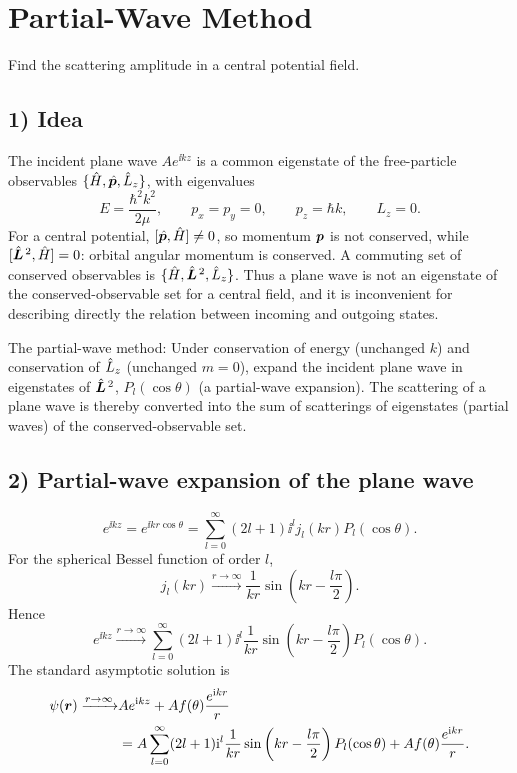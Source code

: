 \section{Partial-Wave Method}
Find the scattering amplitude in a central potential field.

\subsection*{1) Idea}
The incident plane wave $Ae^{\ii kz}$ is a common eigenstate of the free-particle observables $\{\hat{H},\hat{\bm{p}},\hat{L}_z\}$, with eigenvalues
\begin{equation}
E=\frac{\hbar^2k^2}{2\mu},\qquad p_x=p_y=0,\qquad p_z=\hbar k,\qquad L_z=0.
\end{equation}
For a central potential, $[\hat{\bm{p}},\hat{H}]\ne0$, so momentum $\bm{p}$ is not conserved, while $[\hat{\bm{L}}^{\,2},\hat{H}]=0$: orbital angular momentum is conserved. A commuting set of conserved observables is $\{\hat{H},\hat{\bm{L}}^{\,2},\hat{L}_z\}$. Thus a plane wave is not an eigenstate of the conserved-observable set for a central field, and it is inconvenient for describing directly the relation between incoming and outgoing states.

The partial-wave method: Under conservation of energy (unchanged $k$) and conservation of $\hat{L}_z$ (unchanged $m=0$), expand the incident plane wave in eigenstates of $\hat{\bm{L}}^{\,2}$, $P_l(\cos\theta)$ (a partial-wave expansion). The scattering of a plane wave is thereby converted into the sum of scatterings of eigenstates (partial waves) of the conserved-observable set.

\subsection*{2) Partial-wave expansion of the plane wave}
\begin{equation}
\boxed{e^{\ii kz}=e^{\ii kr\cos\theta}
=\sum_{l=0}^\infty(2l+1)\ii^l j_l(kr)P_l(\cos\theta).}
\end{equation}
For the spherical Bessel function of order $l$,
\begin{equation}
j_l(kr)\xrightarrow{r\to\infty}\frac1{kr}
\sin\left(kr-\frac{l\pi}{2}\right).
\end{equation}
Hence
\begin{equation}
e^{\ii kz}\xrightarrow{r\to\infty}
\sum_{l=0}^\infty(2l+1)\ii^l\frac1{kr}
\sin\left(kr-\frac{l\pi}{2}\right)P_l(\cos\theta).
\end{equation}
The standard asymptotic solution is
\begin{equation}\begin{aligned}
\psi(\bm{r})\xrightarrow{r\to\infty}
&Ae^{\mathrm{i} kz}+Af(\theta)\frac{e^{\mathrm{i} kr}}r\\
&=A\sum_{l=0}^\infty(2l+1)\mathrm{i}^l\frac1{kr}
\sin\left(kr-\frac{l\pi}2\right)P_l(\cos\theta)
+Af(\theta)\frac{e^{\mathrm{i} kr}}r.
\end{aligned}\end{equation}

